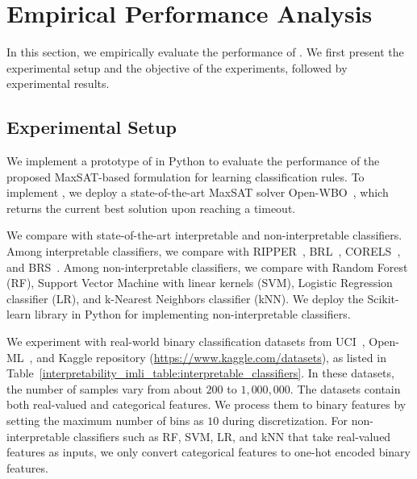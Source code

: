 
\section{Empirical Performance Analysis}
\label{interpretability_imli_sec:experiments}
In this section, we empirically evaluate the performance of {\imli}. We first present the experimental setup and the objective of the experiments, followed by experimental results.


\subsection{Experimental Setup}
We implement a prototype of {\imli} in Python to evaluate the performance of the proposed MaxSAT-based formulation for learning classification rules. To implement {\imli}, we deploy a state-of-the-art MaxSAT solver Open-WBO~\cite{martins2014open}, which returns the current best solution upon reaching a timeout. 

We compare {\imli} with state-of-the-art interpretable and non-interpretable classifiers. Among interpretable classifiers, we compare with RIPPER~\cite{cohen1995fast}, BRL~\cite{letham2015interpretable}, CORELS~\cite{angelino2017learning}, and BRS~\cite{wang2017bayesian}. Among non-interpretable classifiers, we compare with Random Forest (RF), Support Vector Machine with linear kernels (SVM), Logistic Regression classifier (LR), and k-Nearest Neighbors classifier (kNN). We deploy the Scikit-learn library in Python for implementing non-interpretable classifiers. 


We experiment with real-world binary classification datasets from  UCI~\cite{Dua:2019}, Open-ML~\cite{OpenML2013}, and Kaggle repository (\url{https://www.kaggle.com/datasets}), as listed in Table~\ref{interpretability_imli_table:interpretable_classifiers}. In these datasets, the number of samples vary from about $ 200 $ to $ 1,000,000 $.  The datasets contain both real-valued and categorical features. We process them to binary features by setting the maximum number of bins as $ 10 $ during discretization. For non-interpretable classifiers such as RF, SVM, LR, and kNN that take real-valued features as inputs, we only convert categorical features to one-hot encoded binary features. 



